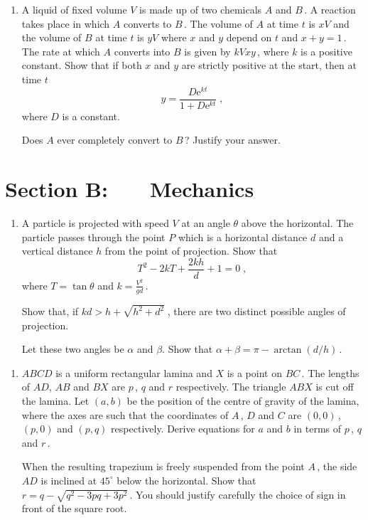 \documentclass[a4, 11pt]{report}
\newlength{\qspace}
\newcounter{qnumber}
\newenvironment{question}%
 {\vspace{\qspace}
  \begin{enumerate}[\bfseries 1\quad][10]%
    \setcounter{enumi}{\value{qnumber}}%
    \item%
 }
{
  \end{enumerate}
  \filbreak
  \stepcounter{qnumber}
 }
\def\e{{\mathrm e}}
\newcommand{\ds}{\displaystyle}
\begin{document}
\begin{question}	
A liquid of fixed volume $V$ is made up of two chemicals $A$ and $B\,$. 
A reaction takes place in which $A$ converts to $B\,$. The volume 
of $A$ at time $t$ is $xV$ 
and the volume of $B$ at time 
$t$ is $yV$ where $x$ and $y$ depend on $t$ and $x+y=1\,$. 
The rate at which $A$ converts into $B$ is given by $kVxy\,$,
 where $k$ is a  positive constant. Show that if both $x$ and $y$ are
 strictly positive at the start, then at time $t$
\[
y= \frac {D\e^{kt}}{1+D \e^{kt}} \;,
\]
where $D$ is a constant. 

Does 
$A$ ever completely convert to
 $B\,$? Justify your answer.
\end{question}	
		

		
	
\newpage
\section*{Section B: \ \ \ Mechanics}


	
\begin{question}
A particle is projected with speed  $V$ 
at an angle $\theta$ above  the horizontal. 
The particle passes through the  point $P$ which is a horizontal distance
$d$ and a vertical distance
$h$  from the point of projection. 
Show that 
\[
T^2 -2kT + \frac{2kh}{d}+1=0\;,
\]
where $T=\tan\theta$ and $\ds k= \frac{V^2}{gd}\,$.

Show that, if 
$\displaystyle {kd > h + \sqrt {h^2 + d^2}}\;$,
 there are two distinct possible angles of projection.



Let these two angles be $\alpha$ and $\beta$. 
Show that 
$\displaystyle \alpha + \beta = \pi - \arctan ( {d/  h}) \,$.
	\end{question}
	
\begin{question}	
$ABCD$ is a uniform rectangular lamina and $X$ is a point on $BC\,$.
The lengths of $AD$, $AB$ and $BX$ are  $p\,$, $q$ and $r$ respectively. 
The triangle $ABX$ is cut off the lamina.
Let $(a,b)$ be the position of the centre of gravity of the lamina,
where the axes are such that 
the coordinates of $A\,$, $D$ and $C$  are $(0,0)\,$,
$(p,0)$ and $(p,q)$ respectively. Derive equations for
$a$ and $b$ in terms of $p\,$, $q$ and $r\,$.

 
When the resulting trapezium is freely suspended from the point $A\,$, 
the side $AD$ is inclined at $45^\circ$ below the horizontal. 
Show that 
$\displaystyle r = q - \sqrt{q^2 - 3pq + 3p^2}\,$. You should justify 
carefully the choice of sign in front of the square root.
\end{question}
\end{document}
